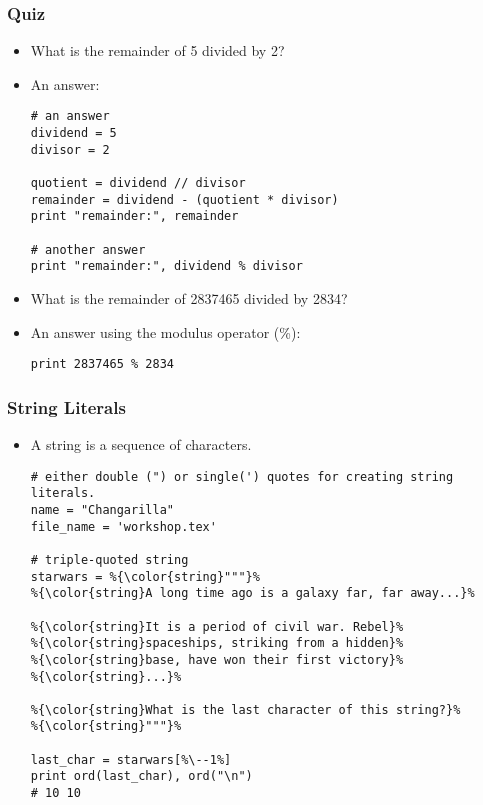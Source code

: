 \documentclass{beamer}
\begin{document}
\begin{frame}[fragile]
\frametitle{Quiz}
\begin{itemize}
\item What is the remainder of 5 divided by 2?
\item An answer:
\begin{lstlisting}[escapechar=\%]
# an answer
dividend = 5
divisor = 2

quotient = dividend // divisor
remainder = dividend - (quotient * divisor)
print "remainder:", remainder

# another answer
print "remainder:", dividend % divisor
\end{lstlisting}
\item What is the remainder of 2837465 divided by 2834?
\item An answer using the modulus operator (\%):
\begin{lstlisting}
print 2837465 % 2834
\end{lstlisting}
\end{itemize}
\end{frame}

\begin{frame}[fragile]
\frametitle{String Literals}
\begin{itemize}
\item A string is a sequence of characters.
\begin{lstlisting}[escapechar=\%]
# either double (") or single(') quotes for creating string literals.
name = "Changarilla"
file_name = 'workshop.tex'

# triple-quoted string
starwars = %{\color{string}"""}%
%{\color{string}A long time ago is a galaxy far, far away...}%

%{\color{string}It is a period of civil war. Rebel}%
%{\color{string}spaceships, striking from a hidden}%
%{\color{string}base, have won their first victory}%
%{\color{string}...}%

%{\color{string}What is the last character of this string?}%
%{\color{string}"""}%

last_char = starwars[%\--1%]
print ord(last_char), ord("\n")
# 10 10
\end{lstlisting}
\end{itemize}
\end{frame}
\end{document}
